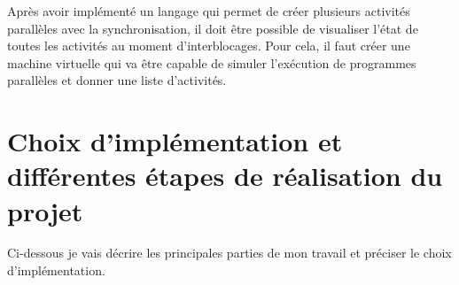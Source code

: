 \documentclass[12pt]{scrartcl}
\begin{document}
 Après avoir implémenté un langage qui permet de créer plusieurs activités parallèles avec la synchronisation, il doit être possible de visualiser l'état de toutes les activités au moment d'interblocages.
 Pour cela, il faut créer une machine virtuelle qui va être capable de simuler l'exécution de programmes parallèles et donner une liste d'activités. \\

 \newpage

 \section{Choix d'implémentation et différentes étapes de réalisation du projet}
Ci-dessous je vais décrire les principales parties de mon travail et préciser le choix d'implémentation. 



\end{document}

